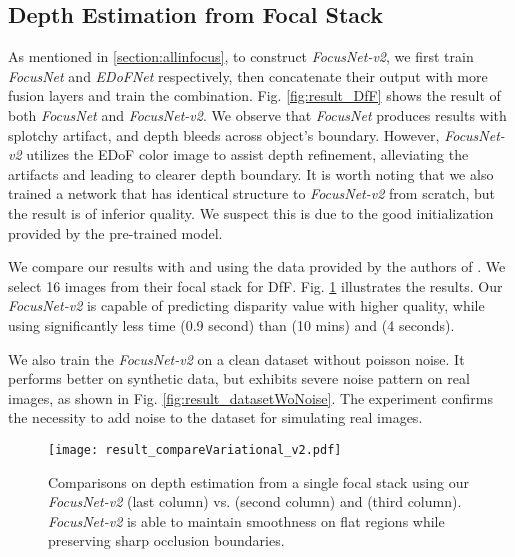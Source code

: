 \documentclass[10pt,twocolumn,letterpaper]{article}
\begin{document}


\subsection{Depth Estimation from Focal Stack}
\label{section:result_FocalStack}

As mentioned in \ref{section:allinfocus}, to construct \emph{FocusNet-v2}, we first train \emph{FocusNet} and \emph{EDoFNet} respectively, then concatenate their output with more fusion layers and train the combination. Fig. \ref{fig:result_DfF} shows the result of both \emph{FocusNet}
and \emph{FocusNet-v2}. We observe that \emph{FocusNet} produces results with splotchy artifact, and depth bleeds across object's boundary. However,
\emph{FocusNet-v2} utilizes the EDoF color image to assist depth refinement, alleviating the artifacts and leading to clearer
depth boundary. It is worth noting that we also trained a network that
has identical structure to \emph{FocusNet-v2} from scratch, but the result is of inferior quality. We suspect this is due to the good initialization provided by the pre-trained model.

We compare our results with \cite{suwajanakorn15} and \cite{moeller15} using the data provided by the authors of \cite{suwajanakorn15}. We select 16 images from their focal stack for DfF. Fig. \ref{fig:result_compareVariation} illustrates the results. Our \emph{FocusNet-v2} is capable of predicting disparity value with higher quality, while using significantly less time (0.9 second) than \cite{suwajanakorn15} (10 mins) and \cite{moeller15} (4 seconds).

We also train the \emph{FocusNet-v2} on a clean dataset without poisson noise. It performs better on synthetic data, but exhibits severe noise pattern on real images, as shown in Fig. \ref{fig:result_datasetWoNoise}. The experiment confirms the necessity to add noise to the dataset for simulating real images.

\begin{figure}[t]
\begin{center}
   \texttt{[image: result\_compareVariational\_v2.pdf]}
\end{center}
\vspace{-8pt}
   \caption{Comparisons on depth estimation from a single focal stack using our \emph{FocusNet-v2} (last column) vs. \cite{suwajanakorn15} (second column) and \cite{moeller15} (third column). \emph{FocusNet-v2} is able to maintain smoothness on flat regions while preserving sharp occlusion boundaries.}
\label{fig:result_compareVariation}
\end{figure}
\end{document}
